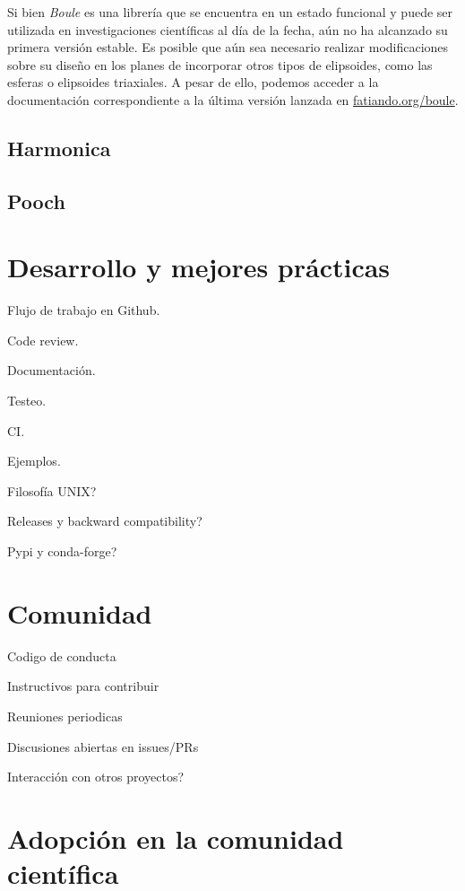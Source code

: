 Si bien \emph{Boule} es una librería que se encuentra en un estado funcional
y puede ser utilizada en investigaciones científicas al día de la fecha, aún no
ha alcanzado su primera versión estable.
Es posible que aún sea necesario realizar modificaciones sobre su diseño en los
planes de incorporar otros tipos de elipsoides, como las esferas o elipsoides
triaxiales.
A pesar de ello, podemos acceder a la documentación correspondiente a la última
versión lanzada en \href{https://www.fatiando.org/verde}{fatiando.org/boule}.


\subsection{Harmonica}

\subsection{Pooch}


\section{Desarrollo y mejores prácticas}
\label{sec:best-practices}

Flujo de trabajo en Github.

Code review.

Documentación.

Testeo.

CI.

Ejemplos.

Filosofía UNIX?

Releases y backward compatibility?

Pypi y conda-forge?


\section{Comunidad}

Codigo de conducta

Instructivos para contribuir

Reuniones periodicas

Discusiones abiertas en issues/PRs

Interacción con otros proyectos?


\section{Adopción en la comunidad científica}

